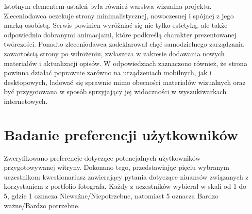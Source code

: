 Istotnym elementem ustaleń była również warstwa wizualna projektu. Zleceniodawca oczekuje strony minimalistycznej, nowoczesnej i spójnej z jego marką osobistą. Serwis powinien wyróżniać się nie tylko estetyką, ale także odpowiednio dobranymi animacjami, które podkreślą charakter prezentowanej twórczości. Ponadto zleceniodawca zadeklarował chęć samodzielnego zarządzania zawartością strony po wdrożeniu, zwłaszcza w zakresie dodawania nowych materiałów i aktualizacji opisów. W odpowiedziach zaznaczono również, że strona powinna działać poprawnie zarówno na urządzeniach mobilnych, jak i desktopowych, ładować się sprawnie mimo obecności materiałów wizualnych oraz być przygotowana w sposób sprzyjający jej widoczności w wyszukiwarkach internetowych.

\chapter{Badanie preferencji użytkowników}
Zweryfikowano preferencje dotyczące potencjalnych użytkowników przygotowywanej witryny. Dokonano tego, przedstawiając pięciu wybranym uczestnikom kwestionariusz zawierający pytania dotyczące niuansów związanych z korzystaniem z portfolio fotografa.
Każdy z uczestników wybierał w skali od 1 do 5, gdzie 1 oznacza Nieważne/Niepotrzebne, natomiast 5 oznacza Bardzo ważne/Bardzo potrzebne.
